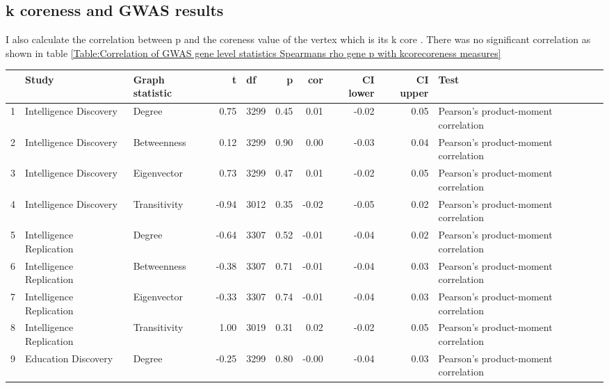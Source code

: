  \subsection{k coreness and GWAS results}
I also calculate the correlation between p and the coreness value of the vertex which is its k core . There was no significant correlation as shown in table \ref{Table:Correlation of GWAS gene level statistics Spearmans rho gene p  with kcorecoreness measures}

\begin{table}[ht]
\centering
\begin{adjustbox}{max width=\textwidth}
\begin{tabular}{rllrlrrrrl}
  \hline
 & Study & Graph statistic & t & df & p & cor & CI lower & CI upper & Test \\ 
  \hline
1 & Intelligence Discovery & Degree & 0.75 & 3299 & 0.45 & 0.01 & -0.02 & 0.05 & Pearson's product-moment correlation \\ 
  2 & Intelligence Discovery & Betweenness & 0.12 & 3299 & 0.90 & 0.00 & -0.03 & 0.04 & Pearson's product-moment correlation \\ 
  3 & Intelligence Discovery & Eigenvector & 0.73 & 3299 & 0.47 & 0.01 & -0.02 & 0.05 & Pearson's product-moment correlation \\ 
  4 & Intelligence Discovery & Transitivity & -0.94 & 3012 & 0.35 & -0.02 & -0.05 & 0.02 & Pearson's product-moment correlation \\ 
  5 & Intelligence Replication & Degree & -0.64 & 3307 & 0.52 & -0.01 & -0.04 & 0.02 & Pearson's product-moment correlation \\ 
  6 & Intelligence Replication & Betweenness & -0.38 & 3307 & 0.71 & -0.01 & -0.04 & 0.03 & Pearson's product-moment correlation \\ 
  7 & Intelligence Replication & Eigenvector & -0.33 & 3307 & 0.74 & -0.01 & -0.04 & 0.03 & Pearson's product-moment correlation \\ 
  8 & Intelligence Replication & Transitivity & 1.00 & 3019 & 0.31 & 0.02 & -0.02 & 0.05 & Pearson's product-moment correlation \\ 
  9 & Education Discovery & Degree & -0.25 & 3299 & 0.80 & -0.00 & -0.04 & 0.03 & Pearson's product-moment correlation \\ 

\end{tabular}
\end{adjustbox}
\end{table}
